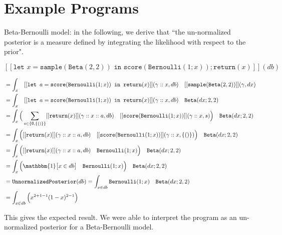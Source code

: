 \documentclass[11pt]{article}
\theoremstyle{definition}
\theoremstyle{plain}
\begin{document}
\newpage

\section{Example Programs}


\noindent Beta-Bernoulli model: in the following, we derive that ``the un-normalized posterior is a measure defined by integrating the likelihood with respect to the prior".

    $$[[\texttt{let } x = \texttt{sample}(\texttt{Beta}(2,2)) \texttt{ in score} (\texttt{Bernoulli}(1;x));\texttt{return}(x)]](db)$$

\begin{align*}
    &= \int_x \quad [[\texttt{let } a =\texttt{score}(\texttt{Bernoulli}(1;x)) \texttt{ in return}(x)]](\gamma::x, db) 
        \quad [[\texttt{sample}(\texttt{Beta}(2,2))]](\gamma,dx)\\
    &= \int_x \quad [[\texttt{let } a =\texttt{score}(\texttt{Bernoulli}(1;x)) \texttt{ in return}(x)]](\gamma::x, db) 
        \quad \texttt{Beta}(dx;2,2)\\
    &= \int_x 
        \Big( \sum_{s \in \{\emptyset,\{()\} \}} [[\texttt{return}(x)]](\gamma::x::a,db) \quad [[\texttt{score}(\texttt{Bernoulli}(1;x))]](\gamma::x,s) \Big)
        \quad \texttt{Beta}(dx;2,2)\\
    &= \int_x 
        \Big( [[\texttt{return}(x)]](\gamma::x::a,db) \quad [[\texttt{score}(\texttt{Bernoulli}(1;x))]](\gamma::x,\{()\}) \Big)
        \quad \texttt{Beta}(dx;2,2)\\
    &= \int_x 
        \Big( [[\texttt{return}(x)]](\gamma::x::a,db) \quad \texttt{Bernoulli}(1;x) \Big)
        \quad \texttt{Beta}(dx;2,2)\\
    &= \int_x 
        \Big(\mathbbm{1}\big[ x \in db \big] \quad \texttt{Bernoulli}(1;x) \Big)
        \quad \texttt{Beta}(dx;2,2)\\
    &= \texttt{UnnormalizedPosterior}(db) = \int_{x \in db} 
        \texttt{Bernoulli}(1;x) \quad \texttt{Beta}(dx;2,2)\\
        &= \int_{x \in db} \Big(x^{2 + 1 - 1}(1-x)^{2 - 1}\Big)
    \end{align*}

\noindent This gives the expected result. We were able to interpret the program as an un-normalized posterior for a Beta-Bernoulli model.\\
\end{document}
